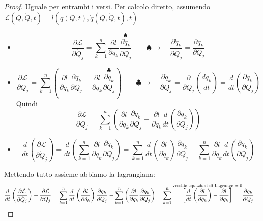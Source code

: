 \documentclass[a4paper,10pt]{article}
\theoremstyle{definition}
\theoremstyle{indentdefinition}
\theoremstyle{indenttheorem}
\theoremstyle{myremark}
\theoremstyle{indentgeneral}
\begin{document}
\begin{proof} Uguale per entrambi i versi.
Per calcolo diretto, assumendo $\mathcal{L}\left(Q,\dot{Q},t\right)=l\left(q\left(Q,t\right),\dot{q}\left(Q,\dot{Q},t\right),t\right)$
\begin{itemize}
    \item $$\frac{\partial\mathcal{L}}{\partial\dot{Q}_{j}}  =\sum_{k=1}^{n}\frac{\partial l}{\partial\dot{q}_{k}}\overset{\spadesuit}{\boxed{\frac{\partial\dot{q}_{k}}{\partial\dot{Q}_{j}}}} \qquad \spadesuit\rightarrow\quad\boxed{\frac{\partial\dot{q}_{k}}{\partial\dot{Q}_{j}}}=\frac{\partial q_{k}}{\partial Q_{j}}$$
    \item $$\frac{\partial\mathcal{L}}{\partial Q_{j}}  =\sum_{k=1}^{n}\left(\frac{\partial l}{\partial q_{k}}\frac{\partial q_{k}}{\partial Q_{j}}+\frac{\partial l}{\partial\dot{q}_{k}}\overset{\clubsuit}{\boxed{\frac{\partial\dot{q}_{k}}{\partial Q_{j}}}}\right) \qquad \clubsuit\rightarrow\quad\boxed{\frac{\partial\dot{q}_{k}}{\partial Q_{j}}}=\frac{\partial}{\partial Q_{j}}\left(\frac{dq_{k}}{dt}\right)=\frac{d}{dt}\left(\frac{\partial q_{k}}{\partial Q_{j}}\right)$$
    Quindi
    $$\frac{\partial\mathcal{L}}{\partial Q_{j}}=\sum_{k=1}^{n}\left(\frac{\partial l}{\partial q_{k}}\frac{\partial q_{k}}{\partial Q_{j}}+\boxed{\frac{\partial l}{\partial\dot{q}_{k}}\frac{d}{dt}\left(\frac{\partial q_{k}}{\partial Q_{j}}\right)}\right)$$
    \item $$\frac{d}{dt}\left(\frac{\partial\mathcal{L}}{\partial\dot{Q}_{j}}\right) =\frac{d}{dt}\left(\sum_{k=1}^{n}\frac{\partial l}{\partial\dot{q}_{k}}\frac{\partial q_{k}}{\partial Q_{j}}\right)=\sum_{k=1}^{n}\frac{d}{dt}\left(\frac{\partial l}{\partial\dot{q}_{k}}\right)\frac{\partial q_{k}}{\partial Q_{j}}+\boxed{\sum_{k=1}^{n}\frac{\partial l}{\partial\dot{q}_{k}}\frac{d}{dt}\left(\frac{\partial q_{k}}{\partial Q_{j}}\right)}$$
\end{itemize}
Mettendo tutto assieme abbiamo la lagrangiana:
\begin{align*}
\frac{d}{dt}\left(\frac{\partial\mathcal{L}}{\partial\dot{Q}_{j}}\right)-\frac{\partial\mathcal{L}}{\partial Q_{j}} & =\sum_{k=1}^{n}\frac{d}{dt}\left(\frac{\partial l}{\partial\dot{q}_{k}}\right)\frac{\partial q_{k}}{\partial Q_{j}}-\sum_{k=1}^{n}\left(\frac{\partial l}{\partial q_{k}}\frac{\partial q_{k}}{\partial Q_{j}}\right)=\sum_{k=1}^{n}\overset{\text{vecchie equazioni di Lagrange \ensuremath{=0}}}{\left[\frac{d}{dt}\left(\frac{\partial l}{\partial\dot{q}_{k}}\right)-\frac{\partial l}{\partial q_{k}}\right]}\frac{\partial q_{k}}{\partial Q_{j}}
\end{align*}
\end{proof}
\end{document}
